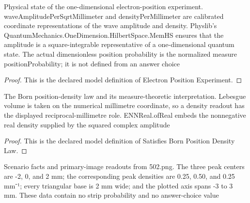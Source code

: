 \begin{definition}
  \label{def:physics:phyx-mini-0502:phyxminiproblems-problemphyxmini0502-electronpositionexperiment}
  Physical state of the one-dimensional electron-position experiment. waveAmplitudePerSqrtMillimeter and densityPerMillimeter are calibrated coordinate representations of the wave amplitude and density. Physlib's QuantumMechanics.OneDimension.HilbertSpace.MemHS ensures that the amplitude is a square-integrable representative of a one-dimensional quantum state. The actual dimensionless position probability is the normalized measure positionProbability; it is not defined from an answer choice
\end{definition}
\begin{proof}
  This is the declared model definition of Electron Position Experiment.
\end{proof}
\begin{definition}
  \label{def:physics:phyx-mini-0502:phyxminiproblems-problemphyxmini0502-satisfiesbornpositiondensitylaw}
  The Born position-density law and its measure-theoretic interpretation. Lebesgue volume is taken on the numerical millimetre coordinate, so a density readout has the displayed reciprocal-millimetre role. ENNReal.ofReal embeds the nonnegative real density supplied by the squared complex amplitude
\end{definition}
\begin{proof}
  This is the declared model definition of Satisfies Born Position Density Law.
\end{proof}
\begin{definition}
  \label{def:physics:phyx-mini-0502:phyxminiproblems-problemphyxmini0502-matchesproblemstatementandfigure}
  Scenario facts and primary-image readouts from 502.png. The three peak centers are -2, 0, and 2 mm; the corresponding peak densities are 0.25, 0.50, and 0.25 mm⁻¹; every triangular base is 2 mm wide; and the plotted axis spans -3 to 3 mm. These data contain no strip probability and no answer-choice value
\end{definition}
